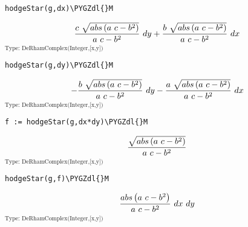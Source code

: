 \documentclass[letterpaper,10pt,english]{sphinxmanual}
\def\PYGZdl{\char`\$}
\begin{document}
\begin{Verbatim}[commandchars=\\\{\}]
hodgeStar(g,dx)\PYGZdl{}M
\end{Verbatim}
\begin{equation*}
\begin{split}{{{c \  {\sqrt {{abs
\left(
{{{a \  c} -{{b} ^ {2}}}}
\right)}}}}
\over {{a \  c} -{{b} ^ {2}}}} \  dy}+{{{b \  {\sqrt {{abs
\left(
{{{a \  c} -{{b} ^ {2}}}}
\right)}}}}
\over {{a \  c} -{{b} ^ {2}}}} \  dx}\end{split}
\end{equation*}
$_{\text{Type: DeRhamComplex(Integer,{[}x,y{]})}}$

\begin{Verbatim}[commandchars=\\\{\}]
hodgeStar(g,dy)\PYGZdl{}M
\end{Verbatim}
\begin{equation*}
\begin{split}-{{{b \  {\sqrt {{abs
\left(
{{{a \  c} -{{b} ^ {2}}}}
\right)}}}}
\over {{a \  c} -{{b} ^ {2}}}} \  dy} -{{{a \  {\sqrt {{abs
\left(
{{{a \  c} -{{b} ^ {2}}}}
\right)}}}}
\over {{a \  c} -{{b} ^ {2}}}} \  dx}\end{split}
\end{equation*}
$_{\text{Type: DeRhamComplex(Integer,{[}x,y{]})}}$

\begin{Verbatim}[commandchars=\\\{\}]
f := hodgeStar(g,dx*dy)\PYGZdl{}M
\end{Verbatim}
\begin{equation*}
\begin{split}{\sqrt {{abs
 \left(
 {{{a \  c} -{{b} ^ {2}}}}
 \right)}}}
 \over {{a \  c} -{{b} ^ {2}}}\end{split}
\end{equation*}
$_{\text{Type: DeRhamComplex(Integer,{[}x,y{]})}}$

\begin{Verbatim}[commandchars=\\\{\}]
hodgeStar(g,f)\PYGZdl{}M
\end{Verbatim}
\begin{equation*}
\begin{split}{{abs
\left(
{{{a \  c} -{{b} ^ {2}}}}
\right)}
\over {{a \  c} -{{b} ^ {2}}}} \  dx \  dy\end{split}
\end{equation*}
$_{\text{Type: DeRhamComplex(Integer,{[}x,y{]})}}$
\end{document}
